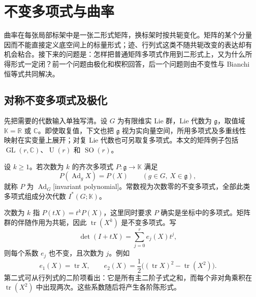 
% 
% 

\section{不变多项式与曲率}
\label{g2:sec:2201}

曲率在每张局部标架中是一张二形式矩阵，换标架时按共轭变化。矩阵的某个分量因而不能直接定义底空间上的标量形式；迹、行列式这类不随共轭改变的表达却有机会粘合。接下来的问题是：怎样把普通矩阵多项式作用到二形式上，又为什么所得形式一定闭？前一个问题由极化和楔积回答，后一个问题则由不变性与 Bianchi 恒等式共同解决。

\subsection{对称不变多项式及极化}
\label{g2:subsec:2201:01}
先把需要的代数输入单独写清。设 \(G\) 为有限维实 Lie 群，Lie 代数为 \(\mathfrak g\)，取值域 \(\mathbb K=\mathbb R\) 或 \(\mathbb C\)。即使取复值，下文也把 \(\mathfrak g\) 视为实向量空间，所用多项式及多重线性映射在实变量上展开；对复 Lie 代数也可另取复多项式。本文的矩阵例子包括 \(\operatorname{GL}(r,\mathbb C)\)、\(\operatorname U(r)\) 和 \(\operatorname{SO}(r)\)。

\begin{definition}\label{g2:def:invariant-polynomial}
	设 \(k\ge1\)。若次数为 \(k\) 的齐次多项式 \(P:\mathfrak g\to\mathbb K\) 满足
	\[
		P(\operatorname{Ad}_gX)=P(X)\qquad(g\in G,\ X\in\mathfrak g),
	\]
	就称 \(P\) 为 \(\operatorname{Ad}_G\)[invariant polynomial]。常数视为次数零的不变多项式，全部此类多项式组成分次代数 \(I^*(G;\mathbb K)\)。
\end{definition}

次数为 \(k\) 指 \(P(tX)=t^kP(X)\)，这里同时要求 \(P\) 确实是坐标中的多项式。矩阵群的伴随作用为共轭，因此 \(\operatorname{tr}(X^k)\) 是不变多项式。写
\[
	\det(I+tX)=\sum_{j=0}^r e_j(X)t^j,
\]
则每个系数 \(e_j\) 也不变，且次数为 \(j\)。例如
\[
	e_1(X)=\operatorname{tr}X,\qquad
	e_2(X)=\frac12\bigl((\operatorname{tr}X)^2-\operatorname{tr}(X^2)\bigr).
\]
第二式可从行列式的二阶项看出：它是所有主二阶子式之和，而每个非对角乘积在 \(\operatorname{tr}(X^2)\) 中出现两次。这些系数随后将产生各阶陈形式。

